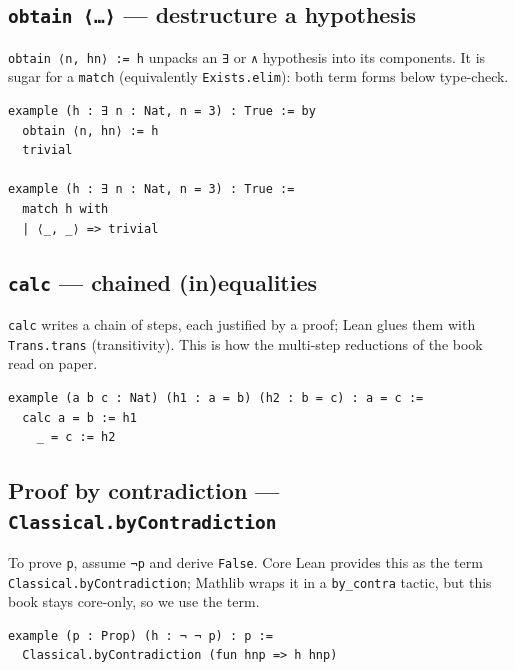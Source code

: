 \documentclass[11pt, a4paper, oneside]{book}
\newcommand{\lc}[1]{\texttt{#1}}
\begin{document}
\subsection*{\lc{obtain ⟨…⟩} --- destructure a hypothesis}

\lc{obtain ⟨n, hn⟩ := h} unpacks an \lc{∃} or \lc{∧} hypothesis into its
components. It is sugar for a \lc{match} (equivalently \lc{Exists.elim}): both
term forms below type-check.

\begin{leanbox}
\begin{verbatim}
example (h : ∃ n : Nat, n = 3) : True := by
  obtain ⟨n, hn⟩ := h
  trivial

example (h : ∃ n : Nat, n = 3) : True :=
  match h with
  | ⟨_, _⟩ => trivial
\end{verbatim}
\end{leanbox}

\subsection*{\lc{calc} --- chained (in)equalities}

\lc{calc} writes a chain of steps, each justified by a proof; Lean glues them
with \lc{Trans.trans} (transitivity). This is how the multi-step reductions of
the book read on paper.

\begin{leanbox}
\begin{verbatim}
example (a b c : Nat) (h1 : a = b) (h2 : b = c) : a = c :=
  calc a = b := h1
    _ = c := h2
\end{verbatim}
\end{leanbox}

\subsection*{Proof by contradiction --- \lc{Classical.byContradiction}}

To prove \lc{p}, assume \lc{¬p} and derive \lc{False}. Core Lean provides this
as the term \lc{Classical.byContradiction}; Mathlib wraps it in a \lc{by\_contra}
tactic, but this book stays core-only, so we use the term.

\begin{leanbox}
\begin{verbatim}
example (p : Prop) (h : ¬ ¬ p) : p :=
  Classical.byContradiction (fun hnp => h hnp)
\end{verbatim}
\end{leanbox}
\end{document}
